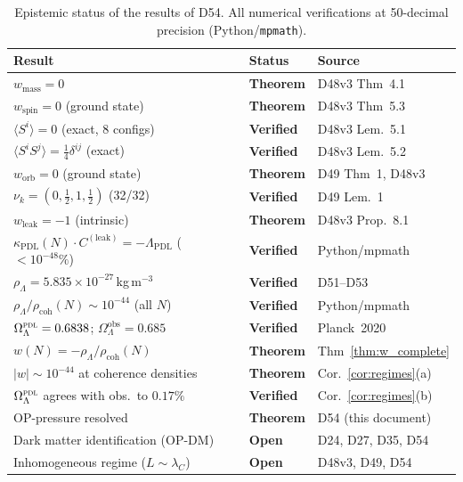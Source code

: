 \documentclass[12pt,a4paper]{article}
\newcommand{\PDL}{\textsc{pdl}}
\newcommand{\Cleak}{C^{(\mathrm{leak})}}
\newcommand{\rhocoh}{\rho_{\mathrm{coh}}}
\newcommand{\kPDL}{\kappa_{\mathrm{PDL}}}
\newcommand{\lambdaC}{\lambda_C}
\newcommand{\LambdaPDL}{\Lambda_{\mathrm{PDL}}}
\newcommand{\rhoLambda}{\rho_\Lambda}
\newcommand{\OmegaL}{\Omega_\Lambda}
\begin{document}
\begin{table}[H]
\centering
\caption{Epistemic status of the results of D54. All numerical verifications at 50-decimal precision (Python/\texttt{mpmath}).}
\label{tab:epistemic}
\small
\begin{tabular}{p{7.0cm}p{2.5cm}p{4.0cm}}
\toprule
Result & Status & Source \\
\midrule
$w_{\mathrm{mass}} = 0$ & \textbf{Theorem} & D48v3 Thm~4.1 \\
$w_{\mathrm{spin}} = 0$ (ground state) & \textbf{Theorem} & D48v3 Thm~5.3 \\
$\langle S^i\rangle = 0$ (exact, 8 configs) & \textbf{Verified} & D48v3 Lem.~5.1 \\
$\langle S^iS^j\rangle = \tfrac{1}{4}\delta^{ij}$ (exact) & \textbf{Verified} & D48v3 Lem.~5.2 \\
$w_{\mathrm{orb}} = 0$ (ground state) & \textbf{Theorem} & D49 Thm~1, D48v3 \\
$\nu_k = (0,\tfrac{1}{2},1,\tfrac{1}{2})$ (32/32) & \textbf{Verified} & D49 Lem.~1 \\
$w_{\mathrm{leak}} = -1$ (intrinsic) & \textbf{Theorem} & D48v3 Prop.~8.1 \\
$\kPDL(N)\cdot\Cleak = -\LambdaPDL$ ($<10^{-48}\%$) & \textbf{Verified} & Python/mpmath \\
$\rhoLambda = 5.835\times10^{-27}$\,kg\,m$^{-3}$ & \textbf{Verified} & D51--D53 \\
$\rhoLambda/\rhocoh(N) \sim 10^{-44}$ (all $N$) & \textbf{Verified} & Python/mpmath \\
$\OmegaL^{\PDL} = 0.6838$; $\OmegaL^{\mathrm{obs}} = 0.685$ & \textbf{Verified} & Planck~2020 \\
$w(N) = -\rhoLambda/\rhocoh(N)$ & \textbf{Theorem} & Thm~\ref{thm:w_complete} \\
$|w| \sim 10^{-44}$ at coherence densities & \textbf{Theorem} & Cor.~\ref{cor:regimes}(a) \\
$\OmegaL^{\PDL}$ agrees with obs.\ to $0.17\%$ & \textbf{Verified} & Cor.~\ref{cor:regimes}(b) \\
OP-pressure resolved & \textbf{Theorem} & D54 (this document) \\
\midrule
Dark matter identification (OP-DM) & \textbf{Open} & D24, D27, D35, D54 \\
Inhomogeneous regime ($L \sim \lambdaC$) & \textbf{Open} & D48v3, D49, D54 \\
\bottomrule
\end{tabular}
\end{table}
\end{document}
